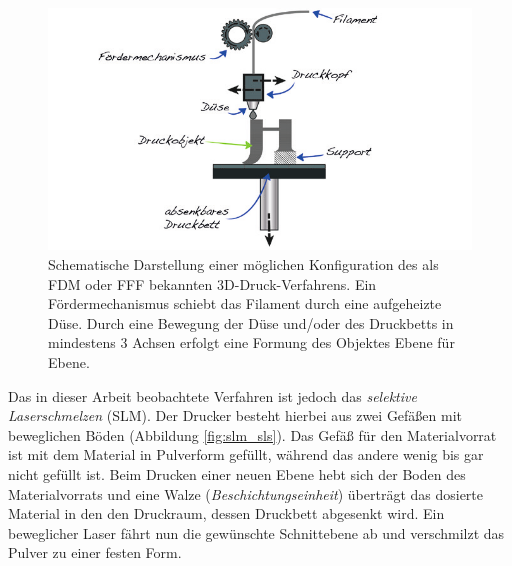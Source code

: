		\begin{figure}[ht]
			\centering
			\includegraphics[width=\textwidth]{chapter/main/img/FDM.png}
			\caption[Schematische Darstellung des FDM-/FFF-Verfahrens]{Schematische Darstellung
			einer möglichen Konfiguration des als FDM oder FFF bekannten 3D-Druck-Verfahrens.
			Ein Fördermechanismus schiebt das Filament durch eine aufgeheizte Düse. Durch eine
			Bewegung der Düse und/oder des Druckbetts in mindestens 3 Achsen erfolgt eine Formung
			des Objektes Ebene für Ebene. \cite[S. 114]{horsch20143d}}
			\label{fig:fdm}
		\end{figure}

		Das in dieser Arbeit beobachtete Verfahren ist jedoch das \emph{selektive Laserschmelzen}
		(SLM). Der Drucker besteht hierbei aus zwei Gefäßen mit beweglichen Böden (Abbildung
		\ref{fig:slm_sls}). Das Gefäß für den Materialvorrat ist mit dem Material in Pulverform
		gefüllt, während das andere wenig bis gar nicht gefüllt ist. Beim Drucken einer neuen Ebene
		hebt sich der Boden des Materialvorrats und eine Walze (\emph{Beschichtungseinheit}) überträgt
		das dosierte Material in den den Druckraum, dessen Druckbett abgesenkt wird. Ein beweglicher
		Laser fährt nun die gewünschte Schnittebene ab und verschmilzt das Pulver zu einer festen Form.

